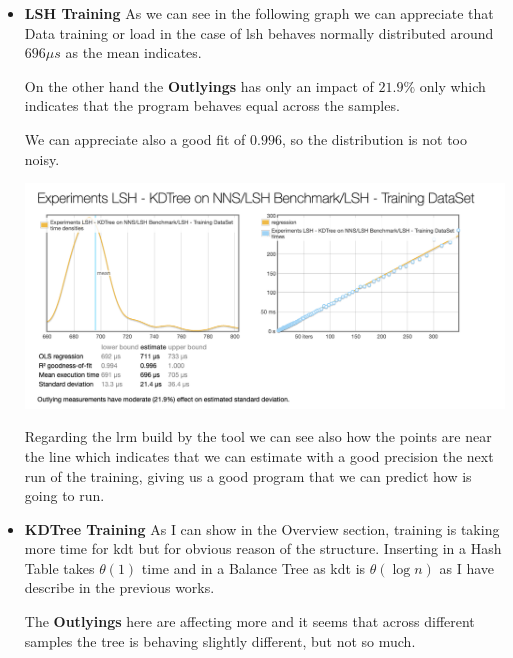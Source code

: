 \documentclass[12pt, a4paper]{article}
\begin{document}
\begin{itemize}
\item \textbf{LSH Training}
As we can see in the following graph we can appreciate that Data training or load in the case of \acrshort{lsh} behaves normally distributed around $696 \mu s$ as the mean indicates.

On the other hand the \textbf{Outlyings} has only an impact of $21.9\%$ only which indicates that the program behaves equal across the samples.

We can appreciate also a good fit of $0.996$, so the distribution is not too noisy.

\begin{minipage}[t]{\linewidth}
  \includegraphics[width=\textwidth]{bench_lsh_load_training_ds}
  \captionsetup{type=figure}
  \label{fig:bench_lsh_load_training_ds}
\end{minipage}

Regarding the \acrshort{lrm} build by the tool we can see also how the points are near the line which indicates that we can estimate with a good precision the next run of the training, giving us a good program that we can predict how is going to run.

\item \textbf{KDTree Training}
As I can show in the Overview section, training is taking more time for \acrshort{kdt} but for obvious reason of the structure. Inserting in a Hash Table takes $\theta(1)$ time and in a Balance Tree as \acrshort{kdt} is $\theta(\log{n})$ as I have describe in the previous works.

The \textbf{Outlyings} here are affecting more and it seems that across different samples the tree is behaving slightly different, but not so much.


\end{itemize}
\end{document}
